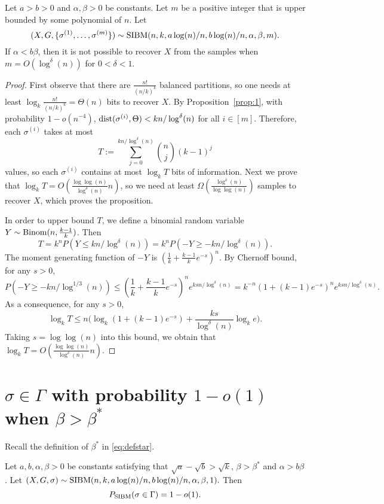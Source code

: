\documentclass{article}
\begin{document}
\begin{proposition}  \label{prop:ab}
Let $a>b>0$ and $\alpha,\beta>0$ be constants. Let $m$ be a positive integer that is upper bounded by some polynomial of $n$.
Let 
$$
(X,G,\{\sigma^{(1)},\dots,\sigma^{(m)}\})\sim \operatorname{SIBM}(n,k, a\log(n)/n, b\log(n)/n,\alpha,\beta, m) .
$$
If $\alpha<b\beta$, then it is not possible to recover $X$ from the samples when $m=O(\log^{\delta}(n))$ for $0 < \delta < 1$.
\end{proposition}

\begin{proof}
First observe that there are $\frac{n!}{(n/k)^k}$ balanced partitions, so one needs at least $\log_k \frac{n!}{(n/k)^k}=\Theta(n)$ bits to recover $X$.
By Proposition~\ref{prop:1}, with probability $1-o(n^{-4})$, $\operatorname{dist}(\sigma^{(i)}, \Theta)< kn/\log^{\delta}(n)$
for all $i\in[m]$. Therefore, each $\sigma^{(i)}$ takes at most
$$
T:=\sum_{j=0}^{kn/\log^{\delta}(n)} \binom{n}{j}(k-1)^j
$$
values, so each $\sigma^{(i)}$ contains at most $\log_k T$ bits of information. Next we prove that $\log_k T=O(\frac{\log\log(n)}{\log^{\delta}(n)} n)$, so we need at least $\Omega(\frac{\log^{\delta}(n)}{\log\log(n)})$ samples to recover $X$, which proves the proposition.

In order to upper bound $T$, we define a binomial random variable $Y\sim\operatorname{Binom}(n,\frac{k-1}{k})$. Then
$$
T=k^n P(Y\le kn/\log^{\delta}(n))
= k^n P(-Y\ge -kn/\log^{\delta}(n)).
$$
The moment generating function of $-Y$ is $(\frac{1}{k}+\frac{k-1}{k}e^{-s})^n$. By Chernoff bound, for any $s>0$,
$$
P(-Y\ge - kn/\log^{1/3}(n)) \le
(\frac{1}{k}+\frac{k-1}{k}e^{-s})^n
e^{ksn/\log^{\delta}(n)}
= k^{-n} (1+(k-1)e^{-s})^n e^{ksn/\log^{\delta}(n)} .
$$
As a consequence, for any $s>0$,
$$
\log_k T\le n\Big(\log_k(1+(k-1)e^{-s})
+\frac{ks}{\log^{\delta}(n)}\log_k e \Big) .
$$
Taking $s=\log\log(n)$ into this bound, we obtain that $\log_k T=O(\frac{\log\log(n)}{\log^{\delta}(n)} n)$.
\end{proof}

\section{$\sigma \in \Gamma$ with probability $1-o(1)$ when $\beta>\beta^\ast$} \label{sect:equal}

Recall the definition of $\beta^\ast$ in \eqref{eq:defstar}.
\begin{proposition} \label{prop:tt}
Let $a,b,\alpha,\beta> 0$ be constants satisfying that $\sqrt{a}-\sqrt{b} > \sqrt{k}$, $\beta>\beta^\ast$ and $\alpha>b\beta$. 
Let 
$
(X,G,\sigma) \sim \operatorname{SIBM}(n,k, a\log(n)/n, b\log(n)/n,\alpha,\beta, 1) .
$
Then
$$
P_{\operatorname{SIBM}}(\sigma \in \Gamma)=1-o(1) .
$$
\end{proposition}
\end{document}
